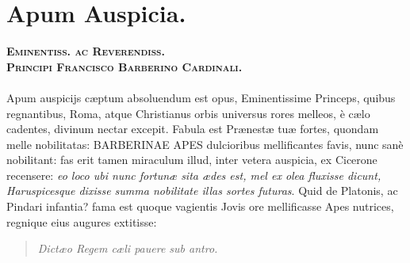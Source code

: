 \documentclass[a4paper, 11pt, oneside, polutonikogreek, latin]{article}
\begin{document}
\section{Apum Auspicia.}
\begin{center}
\scshape\textbf{Eminentiss. ac Reverendiss.\\Principi Francisco Barberino Cardinali.}
\end{center}
\paragraph{}
Apum auspicijs cæptum absoluendum est opus, Eminentissime Princeps, quibus regnantibus, Roma, atque Christianus orbis universus rores melleos, è cælo cadentes, divinum nectar excepit. Fabula est Prænestæ tuæ fortes, quondam melle nobilitatas: BARBERINAE APES dulcioribus mellificantes favis, nunc sanè nobilitant: fas erit tamen miraculum illud, inter vetera auspicia, ex Cicerone recensere: \emph{eo loco ubi nunc fortunæ sita ædes est, mel ex olea fluxisse dicunt, Haruspicesque dixisse summa nobilitate illas sortes futuras}. Quid de Platonis, ac Pindari infantia? fama est quoque vagientis Jovis ore mellificasse Apes nutrices, regnique eius augures extitisse:
\begin{quote}
\emph{Dictæo Regem cæli pauere sub antro.}
\end{quote}
\vspace*{-4mm}
\end{document}
